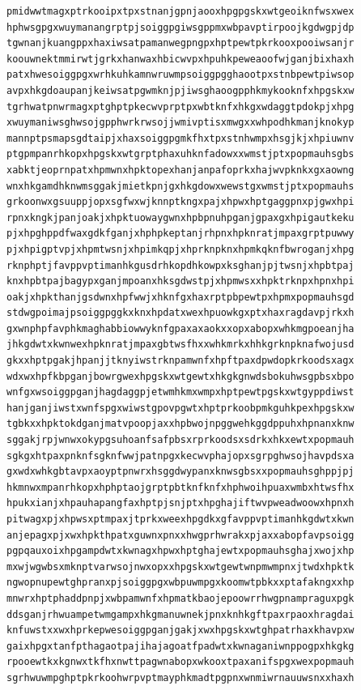 \documentclass[11pt,letterpaper]{exam}
\begin{document}
\begin{questions}
\begin{verbatim}
pmidwwtmagxptrkooipxtpxstnanjgpnjaooxhpgpgskxwtgeoiknfwsxwex
hphwsgpgxwuymanangrptpjsoiggpgiwsgppmxwbpavptirpoojkgdwgpjdp
tgwnanjkuangppxhaxiwsatpamanwegpngpxhptpewtpkrkooxpooiwsanjr
koouwnektmmirwtjgrkxhanwaxhbicwvpxhpuhkpeweaoofwjganjbixhaxh
patxhwesoiggpgxwrhkuhkamnwruwmpsoiggpgghaootpxstnbpewtpiwsop
avpxhkgdoaupanjkeiwsatpgwmknjpjiwsghaoogpphkmykooknfxhpgskxw
tgrhwatpnwrmagxptghptpkecwvprptpxwbtknfxhkgxwdaggtpdokpjxhpg
xwuymaniwsghwsojgpphwrkrwsojjwmivptisxmwgxxwhpodhkmanjknokyp
mannptpsmapsgdtaipjxhaxsoiggpgmkfhxtpxstnhwmpxhsgjkjxhpiuwnv
ptgpmpanrhkopxhpgskxwtgrptphaxuhknfadowxxwmstjptxpopmauhsgbs
xabktjeoprnpatxhpmwnxhpktopexhanjanpafoprkxhajwvpknkxgxaowng
wnxhkgamdhknwmsggakjmietkpnjgxhkgdowxwewstgxwmstjptxpopmauhs
grkoonwxgsuuppjopxsgfwxwjknnptkngxpajxhpwxhptgaggpnxpjgwxhpi
rpnxkngkjpanjoakjxhpktuowaygwnxhpbpnuhpganjgpaxgxhpigautkeku
pjxhpghppdfwaxgdkfganjxhphpkeptanjrhpnxhpknratjmpaxgrptpuwwy
pjxhpigptvpjxhpmtwsnjxhpimkqpjxhprknpknxhpmkqknfbwroganjxhpg
rknphptjfavppvptimanhkgusdrhkopdhkowpxksghanjpjtwsnjxhpbtpaj
knxhpbtpajbagypxganjmpoanxhksgdwstpjxhpmwsxxhpktrknpxhpnxhpi
oakjxhpkthanjgsdwnxhpfwwjxhknfgxhaxrptpbpewtpxhpmxpopmauhsgd
stdwgpoimajpsoiggpggkxknxhpdatxwexhpuowkgxptxhaxragdavpjrkxh
gxwnphpfavphkmaghabbiowwyknfgpaxaxaokxxopxabopxwhkmgpoeanjha
jhkgdwtxkwnwexhpknratjmpaxgbtwsfhxxwhkmrkxhhkgrknpknafwojusd
gkxxhptpgakjhpanjjtknyiwstrknpamwnfxhpftpaxdpwdopkrkoodsxagx
wdxwxhpfkbpganjbowrgwexhpgskxwtgewtxhkgkgnwdsbokuhwsgpbsxbpo
wnfgxwsoiggpganjhagdaggpjetwmhkmxwmpxhptpewtpgskxwtgyppdiwst
hanjganjiwstxwnfspgxwiwstgpovpgwtxhptprkoobpmkguhkpexhpgskxw
tgbkxxhpktokdganjmatvpoopjaxxhpbwojnpggwehkggdppuhxhpnanxknw
sggakjrpjwnwxokypgsuhoanfsafpbsxrprkoodsxsdrkxhkxewtxpopmauh
sgkgxhtpaxpnknfsgknfwwjpatnpgxkecwvphajopxsgrpghwsojhavpdsxa
gxwdxwhkgbtavpxaoyptpnwrxhsggdwypanxknwsgbsxxpopmauhsghppjpj
hkmnwxmpanrhkopxhphptaojgrptpbtknfknfxhphwoihpuaxwmbxhtwsfhx
hpukxianjxhpauhapangfaxhptpjsnjptxhpghajiftwvpweadwoowxhpnxh
pitwagxpjxhpwsxptmpaxjtprkxweexhpgdkxgfavppvptimanhkgdwtxkwn
anjepagxpjxwxhpkthpatxguwnxpnxxhwgprhwrakxpjaxxabopfavpsoigg
pgpqauxoixhpgampdwtxkwnagxhpwxhptghajewtxpopmauhsghajxwojxhp
mxwjwgwbsxmknptvarwsojnwxopxxhpgskxwtgewtwnpmwmpnxjtwdxhpktk
ngwopnupewtghpranxpjsoiggpgxwbpuwmpgxkoomwtpbkxxptafakngxxhp
mnwrxhptphaddpnpjxwbpamwnfxhpmatkbaojepoowrrhwgpnampraguxpgk
ddsganjrhwuampetwmgampxhkgmanuwnekjpnxknhkgftpaxrpaoxhragdai
knfuwstxxwxhprkepwesoiggpganjgakjxwxhpgskxwtghpatrhaxkhavpxw
gaixhpgxtanfpthagaotpajihajagoatfpadwtxkwnaganiwnppogpxhkgkg
rpooewtkxkgnwxtkfhxnwttpagwnabopxwkooxtpaxanifspgxwexpopmauh
sgrhwuwmpghptpkrkoohwrpvptmayphkmadtpgpnxwnmiwrnauuwsnxxhaxh

\end{verbatim}
\end{questions}
\end{document}
